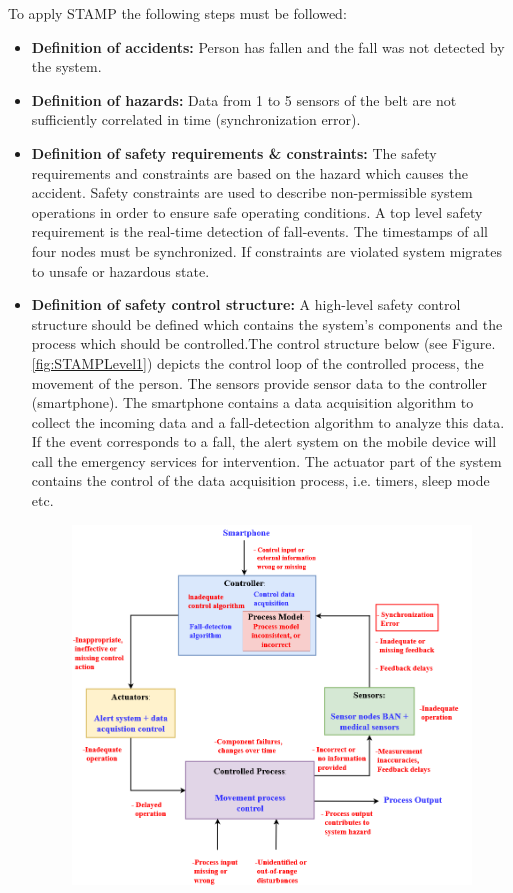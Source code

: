 \documentclass[review]{elsarticle}
\begin{document}
To apply STAMP the following steps must be followed:

\begin{itemize}
	\item \textbf{Definition of accidents:} Person has fallen and the fall was not detected by the system.
	\item \textbf{Definition of hazards:} Data from 1 to 5 sensors of the belt are not sufficiently correlated in time (synchronization error).
	\item \textbf{Definition of safety requirements \& constraints:} The safety requirements and constraints are based on the hazard which causes the accident. Safety constraints are used to describe non-permissible system operations in order to ensure safe operating conditions. A top level safety requirement is the real-time detection of fall-events. The timestamps of all four nodes must be synchronized. If constraints are violated system migrates to unsafe or hazardous state.
	\item \textbf{Definition of safety control structure:}
	A high-level safety control structure should be defined which contains the system's components and the process which should be controlled.The control structure below (see Figure. \ref{fig:STAMPLevel1}) depicts the control loop of the controlled process, the movement of the person.
	The sensors provide sensor data to the controller (smartphone). The smartphone contains a data acquisition algorithm to collect the incoming data and a fall-detection algorithm to analyze this data. If the event corresponds to a fall, the alert system on the mobile device will call the emergency services for intervention. The actuator part of the system contains the control of the data acquisition process, i.e. timers, sleep mode etc.
	\begin{figure}[!ht]
		\centering
		\includegraphics[scale=0.36]{images/STAMP_SynchError}

\end{figure}
\end{itemize}
\end{document}
